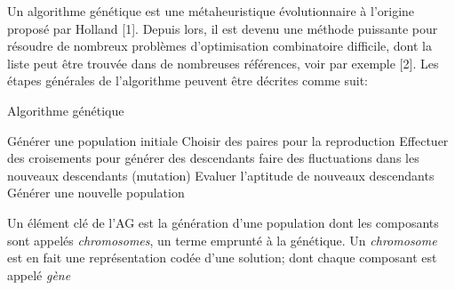 \documentclass{article}
\begin{document}
Un algorithme génétique est une métaheuristique évolutionnaire à l'origine proposé par Holland [1]. Depuis lors, il est devenu une méthode puissante pour résoudre de nombreux problèmes d'optimisation combinatoire difficile, dont la liste peut être trouvée dans de nombreuses références, voir par exemple [2]. Les étapes générales de l'algorithme peuvent être décrites comme suit:
\newline

\begin{algorithm}[H]
	\caption{Algorithme génétique}
	\begin{algorithmic}
		\STATE Générer une population initiale\;
			\STATE Choisir des paires pour la reproduction\;
			\STATE Effectuer des croisements pour générer des descendants\;
			\STATE faire des fluctuations dans les nouveaux descendants (mutation)\;
			\STATE Evaluer l'aptitude de nouveaux descendants\;
			\STATE Générer une nouvelle population\;
		\ENDWHILE
	\end{algorithmic}
\end{algorithm}

Un élément clé de l'AG est la génération d'une population dont les composants sont appelés \textit{chromosomes}, un terme emprunté à la génétique. Un \textit{chromosome} est en fait une représentation codée d'une solution; dont chaque composant est appelé \textit{gène}
\end{document}
